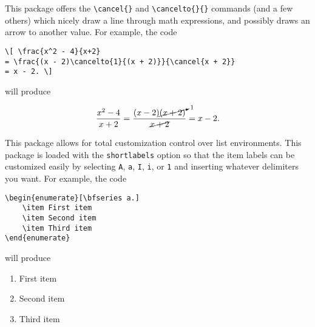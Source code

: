\documentclass[letterpaper,12pt]{article}
\begin{document}
\begin{description}[align=margin,labelsep=0pt,leftmargin=0pt,style=multiline,labelwidth=63pt]
{}
\item[\href{http://mirrors.concertpass.com/tex-archive/macros/latex/contrib/cancel/cancel.pdf}{\texttt{cancel}}] This package offers the \verb|\cancel{}| and \verb|\cancelto{}{}| commands (and a few others) which nicely draw a line through math expressions, and possibly draws an arrow to another value. For example, the code

\begin{Verbatim}[frame=single,gobble=0,fontsize=\small]
\[ \frac{x^2 - 4}{x+2}
= \frac{(x - 2)\cancelto{1}{(x + 2)}}{\cancel{x + 2}}
= x - 2. \]
\end{Verbatim}
will produce
\Needspace*{1in}
\begin{shaded*}
\[ \frac{x^2 - 4}{x+2}
= \frac{(x - 2)\cancelto{1}{(x + 2)}}{\cancel{x + 2}}
= x - 2. \]
\end{shaded*}


{}
\item[\href{http://ctan.mirrors.hoobly.com/macros/latex/contrib/enumitem/enumitem.pdf}{\texttt{enumitem}}] This package allows for total customization control over list environments. This package is loaded with the \texttt{shortlabels} option so that the item labels can be customized easily by selecting \texttt{A}, \texttt{a}, \texttt{I}, \texttt{i}, or \texttt{1} and inserting whatever delimiters you want. For example, the code

\begin{Verbatim}[frame=single,gobble=0,fontsize=\small]
\begin{enumerate}[\bfseries a.]
	\item First item
	\item Second item
	\item Third item
\end{enumerate}
\end{Verbatim}
will produce
\begin{shaded*}
\begin{enumerate}[\bfseries a., labelsep=*]
	\item First item
	\item Second item
	\item Third item
\end{enumerate}
\end{shaded*}



\end{description}
\end{document}

